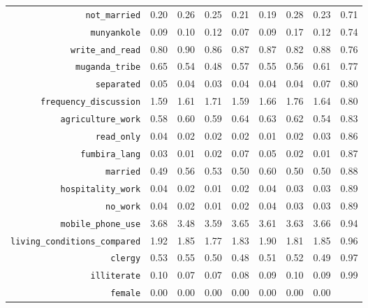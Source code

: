 \begin{longtable}{rrrrrrrrr}
  {\texttt{not\_married}} & 0.20 & 0.26 & 0.25 & 0.21 & 0.19 & 0.28 & 0.23 & 0.71 \\ 
  {\texttt{munyankole}} & 0.09 & 0.10 & 0.12 & 0.07 & 0.09 & 0.17 & 0.12 & 0.74 \\ 
  {\texttt{write\_and\_read}} & 0.80 & 0.90 & 0.86 & 0.87 & 0.87 & 0.82 & 0.88 & 0.76 \\ 
  {\texttt{muganda\_tribe}} & 0.65 & 0.54 & 0.48 & 0.57 & 0.55 & 0.56 & 0.61 & 0.77 \\ 
  {\texttt{separated}} & 0.05 & 0.04 & 0.03 & 0.04 & 0.04 & 0.04 & 0.07 & 0.80 \\ 
  {\texttt{frequency\_discussion}} & 1.59 & 1.61 & 1.71 & 1.59 & 1.66 & 1.76 & 1.64 & 0.80 \\ 
  {\texttt{agriculture\_work}} & 0.58 & 0.60 & 0.59 & 0.64 & 0.63 & 0.62 & 0.54 & 0.83 \\ 
  {\texttt{read\_only}} & 0.04 & 0.02 & 0.02 & 0.02 & 0.01 & 0.02 & 0.03 & 0.86 \\ 
  {\texttt{fumbira\_lang}} & 0.03 & 0.01 & 0.02 & 0.07 & 0.05 & 0.02 & 0.01 & 0.87 \\ 
  {\texttt{married}} & 0.49 & 0.56 & 0.53 & 0.50 & 0.60 & 0.50 & 0.50 & 0.88 \\ 
  {\texttt{hospitality\_work}} & 0.04 & 0.02 & 0.01 & 0.02 & 0.04 & 0.03 & 0.03 & 0.89 \\ 
  {\texttt{no\_work}} & 0.04 & 0.02 & 0.01 & 0.02 & 0.04 & 0.03 & 0.03 & 0.89 \\ 
  {\texttt{mobile\_phone\_use}} & 3.68 & 3.48 & 3.59 & 3.65 & 3.61 & 3.63 & 3.66 & 0.94 \\ 
  {\texttt{living\_conditions\_compared}} & 1.92 & 1.85 & 1.77 & 1.83 & 1.90 & 1.81 & 1.85 & 0.96 \\ 
  {\texttt{clergy}} & 0.53 & 0.55 & 0.50 & 0.48 & 0.51 & 0.52 & 0.49 & 0.97 \\ 
  {\texttt{illiterate}} & 0.10 & 0.07 & 0.07 & 0.08 & 0.09 & 0.10 & 0.09 & 0.99 \\ 
  {\texttt{female}} & 0.00 & 0.00 & 0.00 & 0.00 & 0.00 & 0.00 & 0.00 &  \\ 
   \hline
\hline
\end{longtable}
